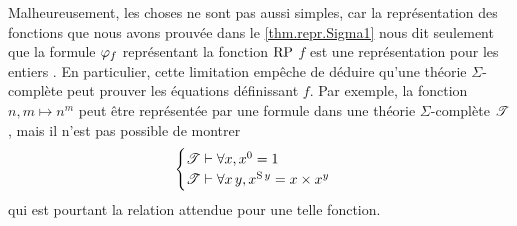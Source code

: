Malheureusement, les choses ne sont pas aussi simples, car la représentation des
fonctions que nous avons prouvée dans le \cref{thm.repr.Sigma1} nous dit
seulement que la formule $\varphi_f$ représentant la fonction $\operatorname{RP}$ $f$ est une
représentation pour les entiers . En particulier, cette
limitation empêche de déduire  qu'une théorie
$\Sigma$-complète peut prouver les équations définissant $f$. Par exemple,
la fonction $n,m \mapsto n^m$ peut être représentée par une formule dans une
théorie $\Sigma$-complète $\mathscr T$, mais il n'est pas possible de montrer
\[\begin{cases} \mathscr T \vdash \forall x, x^0 = 1 \\
\mathscr T \vdash \forall x\,y,x^{\operatorname{S} y} = x \times x^y\end{cases}\]
qui est pourtant la relation attendue pour une telle fonction.

